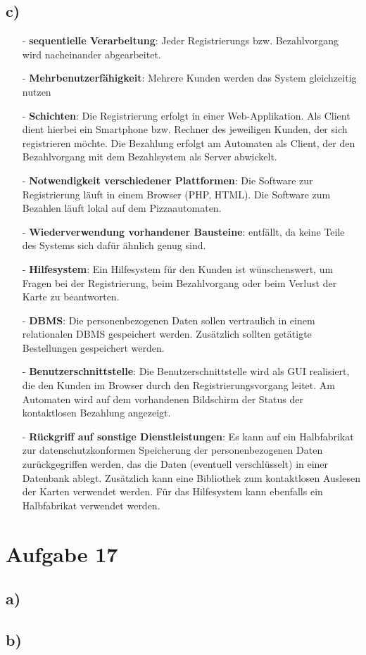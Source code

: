 \subsection*{c)}
\begin{itemize}
\item[-] \textbf{sequentielle Verarbeitung}: Jeder Registrierungs bzw. Bezahlvorgang wird nacheinander abgearbeitet.
\item[-] \textbf{Mehrbenutzerfähigkeit}: Mehrere Kunden werden das System gleichzeitig nutzen
\item[-] \textbf{Schichten}: Die Registrierung erfolgt in einer Web-Applikation. Als Client dient hierbei ein Smartphone bzw. Rechner des jeweiligen Kunden, der sich registrieren möchte. Die Bezahlung erfolgt am Automaten als Client, der den Bezahlvorgang mit dem Bezahlsystem als Server abwickelt.
\item[-] \textbf{Notwendigkeit verschiedener Plattformen}: Die Software zur Registrierung läuft in einem Browser (PHP, HTML). Die Software zum Bezahlen läuft lokal auf dem Pizzaautomaten.
\item[-] \textbf{Wiederverwendung vorhandener Bausteine}: entfällt, da keine Teile des Systems sich dafür ähnlich genug sind.
\item[-] \textbf{Hilfesystem}: Ein Hilfesystem für den Kunden ist wünschenswert, um Fragen bei der Registrierung, beim Bezahlvorgang oder beim Verlust der Karte zu beantworten.\\
\item[-] \textbf{DBMS}: Die personenbezogenen Daten sollen vertraulich in einem relationalen DBMS gespeichert werden. Zusätzlich sollten getätigte Bestellungen gespeichert werden. 
\item[-] \textbf{Benutzerschnittstelle}: Die Benutzerschnittstelle wird als GUI realisiert, die den Kunden im Browser durch den Registrierungsvorgang leitet. Am Automaten wird auf dem vorhandenen Bildschirm der Status der kontaktlosen Bezahlung angezeigt.
\item[-] \textbf{Rückgriff auf sonstige Dienstleistungen}: Es kann auf ein Halbfabrikat zur datenschutzkonformen Speicherung der personenbezogenen Daten zurückgegriffen werden, das die Daten (eventuell verschlüsselt) in einer Datenbank ablegt. Zusätzlich kann eine Bibliothek zum kontaktlosen Auslesen der Karten verwendet werden. Für das Hilfesystem kann ebenfalls ein Halbfabrikat verwendet werden.
\end{itemize}
\newpage
\section*{Aufgabe 17}
\lstset{basicstyle=\tiny ,language=Java}
\subsection*{a)}

\newpage
\subsection*{b)}


